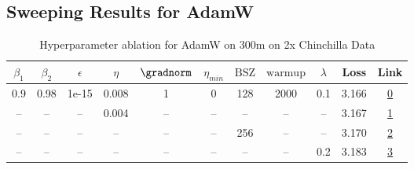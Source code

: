 \subsection{Sweeping Results for AdamW}%
\begin{table}[H]
\centering
\caption{Hyperparameter ablation for AdamW on 300m on 2x Chinchilla Data}
\label{tab:ablation_adamw_300m_on_2x_chinchilla_data}
\begin{tabular}{ccccccccccc}
\toprule
$\beta_1$ & $\beta_2$ & $\epsilon$ & $\eta$ & $\gradnorm$ & $\eta_{min}$ & $\mathrm{BSZ}$ & $\mathrm{warmup}$ & $\lambda$ & Loss & Link \\
\midrule
0.9 & 0.98 & 1e-15 & 0.008 & 1 & 0 & 128 & 2000 & 0.1 & 3.166 & \href{https://wandb.ai/stanford-mercury/optimizer-scaling/runs/sweep-300m-12B-adamwbd209alr0.008-wd0.1-minlr0.0-warmup2000-b10.-25750f}{0} \\
\midrule
-- & -- & -- & 0.004 & -- & -- & -- & -- & -- & 3.167 & \href{https://wandb.ai/stanford-mercury/optimizer-scaling/runs/sweep-300m-12B-adamw065712lr0.004-wd0.1-minlr0.0-warmup2000-b10.-593504}{1} \\
-- & -- & -- & -- & -- & -- & 256 & -- & -- & 3.170 & \href{https://wandb.ai/stanford-mercury/optimizer-scaling/runs/sweep-300m-12B-adamwdef996lr0.008-wd0.1-minlr0.0-warmup2000-b10.-75d2a3}{2} \\
-- & -- & -- & -- & -- & -- & -- & -- & 0.2 & 3.183 & \href{https://wandb.ai/stanford-mercury/optimizer-scaling/runs/sweep-300m-12B-adamwb1b055lr0.008-wd0.2-minlr0.0-warmup2000-b10.-63e273}{3} \\
\bottomrule
\end{tabular}
\end{table}

